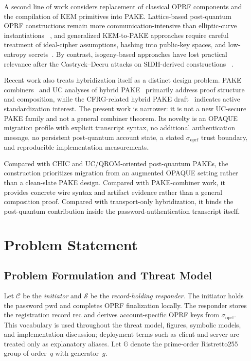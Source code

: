 \documentclass[preprint,12pt]{elsarticle}
\newcommand{\sigoprf}{\sigma_{\mathrm{oprf}}}
\theoremstyle{remark}
\begin{document}
A second line of work considers replacement of classical OPRF
components and the compilation of KEM primitives into PAKE.
Lattice-based post-quantum OPRF constructions remain
more communication-intensive than elliptic-curve instantiations
~\cite{beguinet2023}, and generalized KEM-to-PAKE approaches require
careful treatment of ideal-cipher assumptions, hashing into public-key
spaces, and low-entropy secrets~\cite{arriaga2024}. By contrast,
isogeny-based approaches have lost practical relevance after the
Castryck--Decru attacks on SIDH-derived constructions
~\cite{castryck2023}.

Recent work also treats hybridization itself as a distinct design
problem. PAKE combiners~\cite{hesse2024} and UC analyses of hybrid
PAKE~\cite{lyu2024hybrid} primarily address proof structure and
composition, while the CFRG-related hybrid PAKE draft~\cite{vos2025}
indicates active standardization interest. The present work is narrower:
it is not a new UC-secure PAKE family and not a general combiner theorem.
Its novelty is an OPAQUE migration profile with explicit transcript
syntax, no additional authentication message, no persistent
post-quantum account state, a stated $\sigoprf$ trust boundary, and
reproducible implementation measurements.

Compared with CHIC and UC/QROM-oriented post-quantum PAKEs, the
construction prioritizes migration from an augmented OPAQUE setting
rather than a clean-slate PAKE design. Compared with PAKE-combiner work,
it provides concrete wire syntax and artifact evidence rather than a
general composition proof. Compared with transport-only hybridization, it
binds the post-quantum contribution inside the password-authentication
transcript itself.

\section{Problem Statement}

\subsection{Problem Formulation and Threat Model}

Let $\mathcal{C}$ be the \emph{initiator} and $\mathcal{S}$ be the
\emph{record-holding responder}. The initiator holds the password
$\mathrm{pwd}$ and completes OPRF finalization locally. The responder
stores the registration record $\mathrm{rec}$ and derives
account-specific OPRF keys from $\sigoprf$. This vocabulary is used
throughout the threat model, figures, symbolic models, and implementation
discussion; deployment terms such as client and server are treated only
as explanatory aliases. Let $\mathbb{G}$ denote the
prime-order Ristretto255 group of order~$q$ with generator~$g$.
\end{document}

